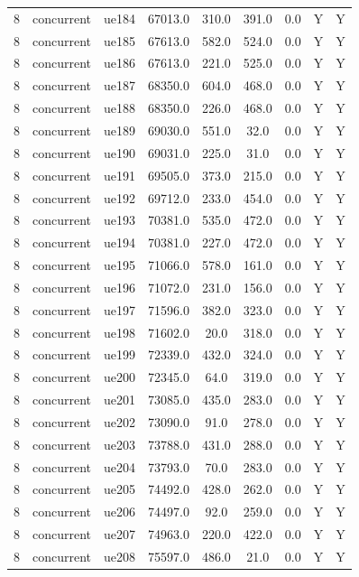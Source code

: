 \begin{table}[ht]
\begin{tabular}{|c|c|c|c|c|c|c|c|c|}
8 & concurrent & ue184 & 67013.0 & 310.0 & 391.0 & 0.0 & Y & Y \\
8 & concurrent & ue185 & 67613.0 & 582.0 & 524.0 & 0.0 & Y & Y \\
8 & concurrent & ue186 & 67613.0 & 221.0 & 525.0 & 0.0 & Y & Y \\
8 & concurrent & ue187 & 68350.0 & 604.0 & 468.0 & 0.0 & Y & Y \\
8 & concurrent & ue188 & 68350.0 & 226.0 & 468.0 & 0.0 & Y & Y \\
8 & concurrent & ue189 & 69030.0 & 551.0 & 32.0 & 0.0 & Y & Y \\
8 & concurrent & ue190 & 69031.0 & 225.0 & 31.0 & 0.0 & Y & Y \\
8 & concurrent & ue191 & 69505.0 & 373.0 & 215.0 & 0.0 & Y & Y \\
8 & concurrent & ue192 & 69712.0 & 233.0 & 454.0 & 0.0 & Y & Y \\
8 & concurrent & ue193 & 70381.0 & 535.0 & 472.0 & 0.0 & Y & Y \\
8 & concurrent & ue194 & 70381.0 & 227.0 & 472.0 & 0.0 & Y & Y \\
8 & concurrent & ue195 & 71066.0 & 578.0 & 161.0 & 0.0 & Y & Y \\
8 & concurrent & ue196 & 71072.0 & 231.0 & 156.0 & 0.0 & Y & Y \\
8 & concurrent & ue197 & 71596.0 & 382.0 & 323.0 & 0.0 & Y & Y \\
8 & concurrent & ue198 & 71602.0 & 20.0 & 318.0 & 0.0 & Y & Y \\
8 & concurrent & ue199 & 72339.0 & 432.0 & 324.0 & 0.0 & Y & Y \\
8 & concurrent & ue200 & 72345.0 & 64.0 & 319.0 & 0.0 & Y & Y \\
8 & concurrent & ue201 & 73085.0 & 435.0 & 283.0 & 0.0 & Y & Y \\
8 & concurrent & ue202 & 73090.0 & 91.0 & 278.0 & 0.0 & Y & Y \\
8 & concurrent & ue203 & 73788.0 & 431.0 & 288.0 & 0.0 & Y & Y \\
8 & concurrent & ue204 & 73793.0 & 70.0 & 283.0 & 0.0 & Y & Y \\
8 & concurrent & ue205 & 74492.0 & 428.0 & 262.0 & 0.0 & Y & Y \\
8 & concurrent & ue206 & 74497.0 & 92.0 & 259.0 & 0.0 & Y & Y \\
8 & concurrent & ue207 & 74963.0 & 220.0 & 422.0 & 0.0 & Y & Y \\
8 & concurrent & ue208 & 75597.0 & 486.0 & 21.0 & 0.0 & Y & Y \\

\end{tabular}
\end{table}
